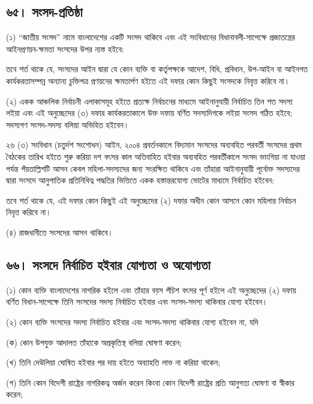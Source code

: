 \documentclass[11pt]{article}
\begin{document}
\subsection{৬৫। সংসদ-প্রতিষ্ঠা}
\label{sec:orgfa42e0e}
(১) “জাতীয় সংসদ” নামে বাংলাদেশের একটি সংসদ থাকিবে এবং এই সংবিধানের
    বিধানাবলী-সাপেক্ষে প্রজাতন্ত্রের আইনপ্রণয়ন-ক্ষমতা সংসদের উপর ন্যস্ত হইবে:

তবে শর্ত থাকে যে, সংসদের আইন দ্বারা যে কোন ব্যক্তি বা কর্তৃপক্ষকে আদেশ, বিধি,
প্রবিধান, উপ-আইন বা আইনগত কার্যকরতাসম্পন্ন অন্যান্য চুক্তিপত্র প্রণয়নের ক্ষমতার্পণ
হইতে এই দফার কোন কিছুই সংসদকে নিবৃত্ত করিবে না।

(২) একক আঞ্চলিক নির্বাচনী এলাকাসমূহ হইতে প্রত্যক্ষ নির্বাচনের মাধ্যমে
    আইনানুযায়ী নির্বাচিত তিন শত সদস্য লইয়া এবং এই অনুচ্ছেদের (৩) দফার
    কার্যকরতাকালে উক্ত দফায় বর্ণিত সদস্যদিগকে লইয়া সংসদ গঠিত হইবে; সদস্যগণ
    সংসদ-সদস্য বলিয়া অভিহিত হইবেন।

২৬ (৩) সংবিধান (চতুর্দশ সংশোধন) আইন, ২০০৪ প্রবর্তনকালে বিদ্যমান সংসদের
অব্যবহিত পরবর্তী সংসদের প্রথম বৈঠকের তারিখ হইতে শুরু করিয়া দশ বৎসর কাল
অতিবাহিত হইবার অব্যবহিত পরবর্তীকালে সংসদ ভাংগিয়া না যাওয়া পর্যন্ত
পঁয়তাল্লিশটি আসন কেবল মহিলা-সদস্যদের জন্য সংরক্ষিত থাকিবে এবং তাঁহারা
আইনানুযায়ী পূর্বোক্ত সদস্যদের দ্বারা সংসদে আনুপাতিক প্রতিনিধিত্ব পদ্ধতির ভিত্তিতে
একক হস্তান্তরযোগ্য ভোটের মাধ্যমে নির্বাচিত হইবেন:

তবে শর্ত থাকে যে, এই দফার কোন কিছুই এই অনুচ্ছেদের (২) দফার অধীন কোন আসনে
কোন মহিলার নির্বাচন নিবৃত্ত করিবে না।

(৪) রাজধানীতে সংসদের আসন থাকিবে।

\subsection{৬৬। সংসদে নির্বাচিত হইবার যোগ্যতা ও অযোগ্যতা}
\label{sec:org0424709}
(১) কোন ব্যক্তি বাংলাদেশের নাগরিক হইলে এবং তাঁহার বয়স পঁচিশ বৎসর পূর্ণ হইলে
    এই অনুচ্ছেদের (২) দফায় বর্ণিত বিধান-সাপেক্ষে তিনি সংসদের সদস্য নির্বাচিত
    হইবার এবং সংসদ-সদস্য থাকিবার যোগ্য হইবেন।

(২) কোন ব্যক্তি সংসদের সদস্য নির্বাচিত হইবার এবং সংসদ-সদস্য থাকিবার যোগ্য
    হইবেন না, যদি

(ক) কোন উপযুক্ত আদালত তাঁহাকে অপ্রকৃতিস্থ বলিয়া ঘোষণা করেন;

(খ) তিনি দেউলিয়া ঘোষিত হইবার পর দায় হইতে অব্যাহতি লাভ না করিয়া থাকেন;

(গ) তিনি কোন বিদেশী রাষ্ট্রের নাগরিকত্ব অর্জন করেন কিংবা কোন বিদেশী
    রাষ্ট্রের প্রতি আনুগত্য ঘোষণা বা স্বীকার করেন;
\end{document}

